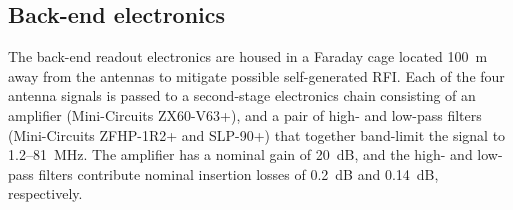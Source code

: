 \documentclass{ws-jai}
\begin{document}



\subsection{Back-end electronics}

The back-end readout electronics are housed in a Faraday cage located
100~m away from the antennas to mitigate possible self-generated RFI.
Each of the four antenna signals is passed to a second-stage
electronics chain consisting of an amplifier (Mini-Circuits ZX60-V63+),
and a pair of high- and low-pass filters (Mini-Circuits ZFHP-1R2+ and
SLP-90+) that together band-limit the signal to 1.2--\SI{81}{MHz}.
The amplifier has a nominal gain of 20~dB, and the high- and low-pass
filters contribute nominal insertion losses of 0.2~dB and 0.14~dB,
respectively.
\end{document}
